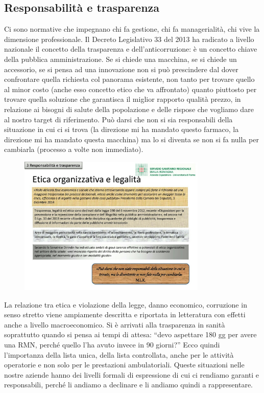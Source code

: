 \subsection{Responsabilità e trasparenza}

Ci sono normative che impegnano chi fa gestione, chi fa managerialità,
chi vive la dimensione professionale. Il Decreto Legislativo 33 del 2013
ha radicato a livello nazionale il concetto della trasparenza e
dell'anticorruzione: è un concetto chiave della pubblica
amministrazione. Se si chiede una macchina, se si chiede un accessorio,
se si pensa ad una innovazione non si può prescindere dal dover
confrontare quella richiesta col panorama esistente, non tanto per
trovare quello al minor costo (anche esso concetto etico che va
affrontato) quanto piuttosto per trovare quella soluzione che garantisca
il miglior rapporto qualità prezzo, in relazione ai bisogni di salute
della popolazione e delle rispose che vogliamo dare al nostro target di
riferimento. Può darsi che non si sia responsabili della situazione in
cui ci si trova (la direzione mi ha mandato questo farmaco, la direzione
mi ha mandato questa macchina) ma lo si diventa se non si fa nulla per
cambiarla (processo a volte non immediato).

 \begin{figure}[!ht]
\centering
	\includegraphics[width=0.8\textwidth]{32/image14.jpeg}
	\end{figure}

La relazione tra etica e violazione della legge, danno economico,
corruzione in senso stretto viene ampiamente descritta e riportata in
letteratura con effetti anche a livello macroeconomico. Si è arrivati
alla trasparenza in sanità soprattutto quando si pensa ai tempi di
attesa: ``devo aspettare 180 gg per avere una RMN, perché quello l'ha
avuto invece in 90 giorni?'' Ecco quindi l'importanza della lista unica,
della lista controllata, anche per le attività operatorie e non solo per
le prestazioni ambulatoriali. Queste situazioni nelle nostre aziende
hanno dei livelli formali di espressione di cui ci rendiamo garanti e
responsabili, perché li andiamo a declinare e li andiamo quindi a
rappresentare.

